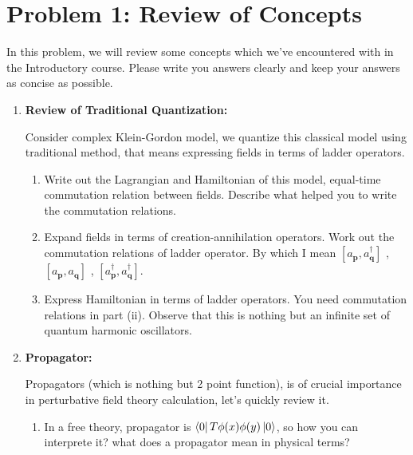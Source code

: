 \documentclass[11pt]{article}
\begin{document}
	
	
	\psetheader
	
	\section*{Problem 1: Review of Concepts %
	}
	
	\begin{problem}
		In this problem, we will review some concepts which we've encountered with in the Introductory course. Please write you answers clearly and keep your answers as concise as possible.
	\end{problem}
	\begin{enumerate}
		\item
		\begin{problem}{\points[2.3 Peskin]{-}}
			\textbf{Review of Traditional Quantization:}
			
			\noindent
			Consider complex Klein-Gordon model, we quantize this classical model using traditional method, that means expressing fields in terms of ladder operators.
			\begin{enumerate}
				\item Write out the Lagrangian and Hamiltonian of this model, equal-time commutation relation between fields. Describe what helped you to write the commutation relations.
				
				\item  Expand fields in terms of creation-annihilation operators. Work out the commutation relations of ladder operator. By which I mean $[a_\mathbf{p},a^\dagger_\mathbf{q}]$ , $[a_\mathbf{p},a_\mathbf{q}]$ , $[a^\dagger_\mathbf{p},a^\dagger_\mathbf{q}]$.
				
				\item Express Hamiltonian in terms of ladder operators. You need commutation relations in part (ii). Observe that this is nothing but an infinite set of quantum harmonic oscillators.
				
			\end{enumerate}
		\end{problem}
		\item
		\begin{problem}{\points[2.4 Peskin]{-}}
		\textbf{Propagator:}
		
		Propagators (which is nothing but 2 point function), is of crucial importance in perturbative field theory calculation, let's quickly review it.
		\noindent
		\begin{enumerate}
			\item In a free theory, propagator is $\bra{0}T\phi(x)\phi(y)\ket{0}$, so how you can interprete it? what does a propagator mean in physical terms?
			

\end{enumerate}
\end{problem}
\end{enumerate}
\end{document}

